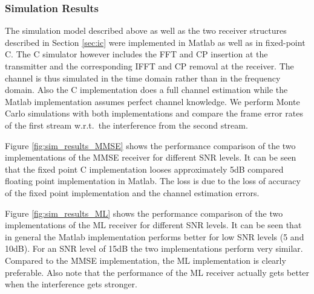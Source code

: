 \documentclass[a4paper,twocolumn,journal]{IEEEtran}
\begin{document}


\subsubsection{Simulation Results}

The simulation model described above as well as the two receiver structures described in Section \ref{sec:ic} were implemented in Matlab as well as in fixed-point C. The C simulator however includes the FFT and CP insertion at the transmitter and the corresponding IFFT and CP removal at the receiver. The channel is thus simulated in the time domain rather than in the frequency domain. Also the C implementation does a full channel estimation while the Matlab implementation assumes perfect channel knowledge. We perform Monte Carlo simulations with both implementations and compare the frame error rates of the first stream w.r.t.\ the interference from the second stream. 

Figure \ref{fig:sim_results_MMSE} shows the performance comparison of the two implementations of the MMSE receiver for different SNR levels.  It can be seen that the fixed point C implementation looses approximately 5dB compared floating point implementation in Matlab. The loss is due to the loss of accuracy of the fixed point implementation and the channel estimation errors. 

Figure \ref{fig:sim_results_ML} shows the performance comparison of the two implementations of the ML receiver for different SNR levels.  It can be seen that in general the Matlab implementation performs better for low SNR levels (5 and 10dB). For an SNR level of 15dB the two implementations perform very similar. Compared to the MMSE implementation, the ML implementation is clearly preferable. Also note that the performance of the ML receiver actually gets better when the interference gets stronger. 
\end{document}
